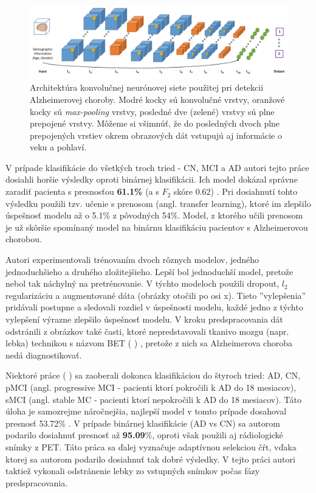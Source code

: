 \begin{figure}[h!]
    \centering
    \includegraphics[scale=0.35]{assets/images/ad_cnn_architecture.png}
    \caption{Architektúra konvolučnej neurónovej siete použitej pri detekcii Alzheimerovej choroby. \cite{esmaeilzadeh2018end} Modré kocky sú konvolučné vrstvy, oranžové kocky sú \textit{max-pooling} vrstvy, posledné dve (zelené) vrstvy sú plne prepojené vrstvy. Môžeme si všimnúť, že do posledných dvoch plne prepojených vrstiev okrem obrazových dát vstupujú aj informácie o veku a pohlaví.}
    \label{fig:ad_cnn_architecture}
\end{figure}

V prípade klasifikácie do všetkých troch tried - CN, MCI a AD autori tejto práce dosiahli horšie výsledky oproti binárnej klasifikácii. Ich model dokázal správne zaradiť pacienta s presnosťou \textbf{61.1\%} (a s $F_2$ skóre 0.62) \cite{esmaeilzadeh2018end}. Pri dosiahnutí tohto výsledku použili tzv. učenie s prenosom (angl. transfer learning), ktoré im zlepšilo úspešnosť modelu až o 5.1\% z pôvodných 54\%. Model, z ktorého učili prenosom je už skôršie spomínaný model na binárnu klasifikáciu pacientov s Alzheimerovou chorobou.

Autori experimentovali trénovaním dvoch rôznych modelov, jedného jednoduchšieho a druhého zložitejšieho. Lepší bol jednoduchší model, pretože nebol tak náchylný na pretrénovanie. V týchto modeloch použili dropout, $l_2$ regularizáciu a augmentované dáta (obrázky otočili po osi x). Tieto ''vylepšenia'' pridávali postupne a sledovali rozdiel v úspešnosti modelu, každé jedno z týchto vylepšení výrazne zlepšilo úspešnosť modelu. V kroku predspracovania dát odstránili z obrázkov také časti, ktoré nepredstavovali tkanivo mozgu (napr. lebka) technikou s názvom BET (\citeauthor*{smith2002fast} \citeyear{smith2002fast}) \cite{smith2002fast}, pretože z nich sa Alzheimerova choroba nedá diagnostikovať.

Niektoré práce (\citeauthor*{suk2016deep} \citeyear{suk2016deep}) sa zaoberali dokonca klasifikáciou do štyroch tried: AD, CN, pMCI (angl. progressive MCI - pacienti ktorí pokročili k AD do 18 mesiacov), sMCI (angl. stable MC - pacienti ktorí nepokročili k AD do 18 mesiacov). Táto úloha je samozrejme náročnejšia, najlepší model v tomto prípade dosahoval presnosť 53.72\% \cite{suk2016deep}. V prípade binárnej klasifikácie (AD vs CN) sa autorom podarilo dosiahnuť presnosť až \textbf{95.09}\%, oproti \citeauthor*{esmaeilzadeh2018end} však použili aj rádiologické snímky z PET. Táto práca sa ďalej vyznačuje adaptívnou selekciou čŕt, vďaka ktorej sa autorom podarilo dosiahnuť tak dobré výsledky. V tejto práci autori taktiež vykonali odstránenie lebky zo vstupných snímkov počas fázy predspracovania.

